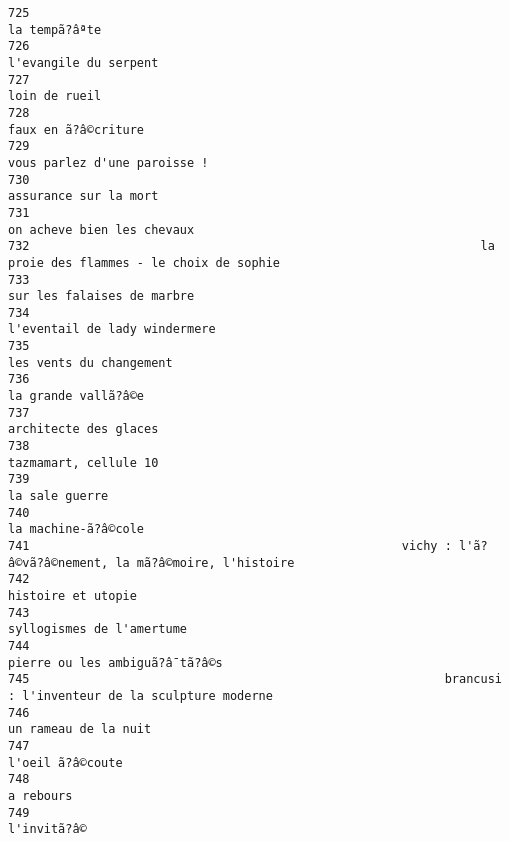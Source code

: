 \documentclass[
]{report}
\begin{document}
\begin{verbatim}
725                                                                                           la tempã?âªte
726                                                                                   l'evangile du serpent
727                                                                                           loin de rueil
728                                                                                     faux en ã?â©criture
729                                                                            vous parlez d'une paroisse !
730                                                                                   assurance sur la mort
731                                                                              on acheve bien les chevaux
732                                                               la proie des flammes - le choix de sophie
733                                                                              sur les falaises de marbre
734                                                                           l'eventail de lady windermere
735                                                                                 les vents du changement
736                                                                                     la grande vallã?â©e
737                                                                                   architecte des glaces
738                                                                                   tazmamart, cellule 10
739                                                                                          la sale guerre
740                                                                                     la machine-ã?â©cole
741                                                    vichy : l'ã?â©vã?â©nement, la mã?â©moire, l'histoire
742                                                                                      histoire et utopie
743                                                                               syllogismes de l'amertume
744                                                                          pierre ou les ambiguã?â¯tã?â©s
745                                                          brancusi : l'inventeur de la sculpture moderne
746                                                                                    un rameau de la nuit
747                                                                                        l'oeil ã?â©coute
748                                                                                               a rebours
749                                                                                             l'invitã?â©

\end{verbatim}
\end{document}
